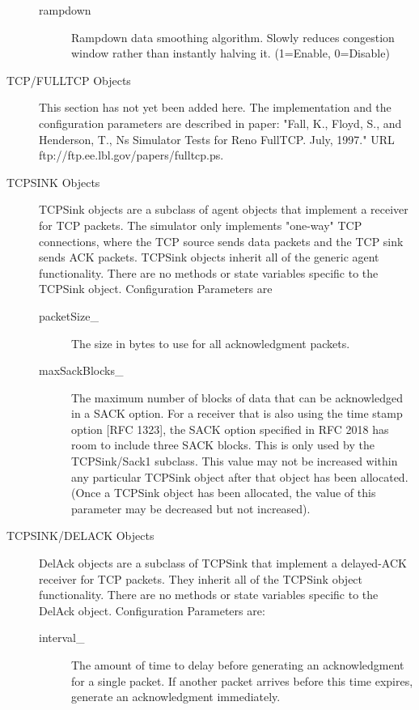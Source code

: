\begin{description}
\begin{description}
\item[rampdown]
Rampdown data smoothing algorithm. Slowly reduces congestion window rather
than instantly halving it. (1=Enable, 0=Disable) 
\end{description}


\item[TCP/FULLTCP Objects]
This section has not yet been added here. The implementation
and the configuration parameters are described in paper: "Fall, K.,
Floyd, S., and Henderson, T., Ns Simulator Tests for Reno FullTCP.
July, 1997." URL ftp://ftp.ee.lbl.gov/papers/fulltcp.ps. 


\item[TCPSINK Objects]
TCPSink objects are a subclass of agent objects that implement a receiver
for TCP packets. The simulator only implements "one-way" TCP connections,
where the TCP source sends data packets and the TCP sink sends ACK
packets. TCPSink objects inherit all of the generic agent functionality.
There are no methods or state variables specific to the TCPSink object. 
Configuration Parameters are
\begin{description}
\item[packetSize\_]
The size in bytes to use for all acknowledgment packets. 

\item[maxSackBlocks\_]
The maximum number of blocks of data that can be acknowledged in a SACK
option. For a receiver that is also using the time stamp option [RFC
1323], the SACK option specified in RFC 2018 has room to include three
SACK blocks. This is only used by the TCPSink/Sack1 subclass. This value
may not be increased within any particular TCPSink object after that
object has been allocated. (Once a TCPSink object has been allocated, the
value of this parameter may be decreased but not increased). 
\end{description}


\item[TCPSINK/DELACK Objects]
DelAck objects are a subclass of TCPSink that implement a delayed-ACK
receiver for TCP packets. They inherit all of the TCPSink object
functionality. There are no methods or state variables specific to the
DelAck object. 
Configuration Parameters are:
\begin{description}
\item[interval\_]
The amount of time to delay before generating an acknowledgment for a
single packet. If another packet arrives before this time expires,
generate an acknowledgment immediately. 
\end{description}



\end{description}
